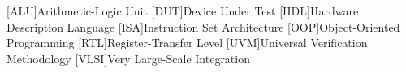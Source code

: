 



\begin{acronym}
    [ALU]{Arithmetic-Logic Unit}
    [DUT]{Device Under Test}
    [HDL]{Hardware Description Language}
    [ISA]{Instruction Set Architecture}
    [OOP]{Object-Oriented Programming}
    [RTL]{Register-Transfer Level}
    [UVM]{Universal Verification Methodology}
    [VLSI]{Very Large-Scale Integration}
\end{acronym}
